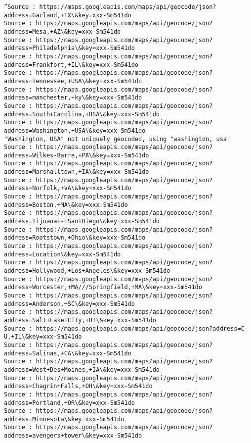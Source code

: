 \documentclass[11pt]{article}
\begin{document}
\begin{Verbatim}[commandchars=\\\{\}]
”Source : https://maps.googleapis.com/maps/api/geocode/json?address=Garland,+TX\&key=xxx-Sm541do
Source : https://maps.googleapis.com/maps/api/geocode/json?address=Mesa,+AZ\&key=xxx-Sm541do
Source : https://maps.googleapis.com/maps/api/geocode/json?address=Philadelphia\&key=xxx-Sm541do
Source : https://maps.googleapis.com/maps/api/geocode/json?address=Frankfort,+IL\&key=xxx-Sm541do
Source : https://maps.googleapis.com/maps/api/geocode/json?address=Tennessee,+USA\&key=xxx-Sm541do
Source : https://maps.googleapis.com/maps/api/geocode/json?address=manchester,+ky\&key=xxx-Sm541do
Source : https://maps.googleapis.com/maps/api/geocode/json?address=South+Carolina,+USA\&key=xxx-Sm541do
Source : https://maps.googleapis.com/maps/api/geocode/json?address=Washington,+USA\&key=xxx-Sm541do
"Washington, USA" not uniquely geocoded, using "washington, usa"
Source : https://maps.googleapis.com/maps/api/geocode/json?address=Wilkes-Barre,+PA\&key=xxx-Sm541do
Source : https://maps.googleapis.com/maps/api/geocode/json?address=Marshalltown,+IA\&key=xxx-Sm541do
Source : https://maps.googleapis.com/maps/api/geocode/json?address=Norfolk,+VA\&key=xxx-Sm541do
Source : https://maps.googleapis.com/maps/api/geocode/json?address=Boston,+MA\&key=xxx-Sm541do
Source : https://maps.googleapis.com/maps/api/geocode/json?address=Tijuana+-+San+Diego\&key=xxx-Sm541do
Source : https://maps.googleapis.com/maps/api/geocode/json?address=Rootstown,+Ohio\&key=xxx-Sm541do
Source : https://maps.googleapis.com/maps/api/geocode/json?address=Location\&key=xxx-Sm541do
Source : https://maps.googleapis.com/maps/api/geocode/json?address=Hollywood,+Los+Angeles\&key=xxx-Sm541do
Source : https://maps.googleapis.com/maps/api/geocode/json?address=Worcester,+MA///Springfield,+MA\&key=xxx-Sm541do
Source : https://maps.googleapis.com/maps/api/geocode/json?address=Anderson,+SC\&key=xxx-Sm541do
Source : https://maps.googleapis.com/maps/api/geocode/json?address=Salt+Lake+City,+UT\&key=xxx-Sm541do
Source : https://maps.googleapis.com/maps/api/geocode/json?address=C-U,+IL\&key=xxx-Sm541do
Source : https://maps.googleapis.com/maps/api/geocode/json?address=Salinas,+CA\&key=xxx-Sm541do
Source : https://maps.googleapis.com/maps/api/geocode/json?address=West+Des+Moines,+IA\&key=xxx-Sm541do
Source : https://maps.googleapis.com/maps/api/geocode/json?address=Chagrin+Falls,+OH\&key=xxx-Sm541do
Source : https://maps.googleapis.com/maps/api/geocode/json?address=Portland,+OR\&key=xxx-Sm541do
Source : https://maps.googleapis.com/maps/api/geocode/json?address=Minnesota\&key=xxx-Sm541do
Source : https://maps.googleapis.com/maps/api/geocode/json?address=avengers+tower\&key=xxx-Sm541do

\end{Verbatim}
\end{document}
